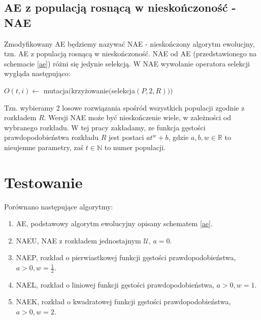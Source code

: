 \documentclass[12pt, a4paper]{article}
\begin{document}
\subsection{AE z populacją rosnącą w nieskończoność - NAE}

Zmodyfikowany AE będziemy nazywać NAE - nieskończony algorytm ewolucjny, tzn. AE z populacją rosnącą w nieskończoność.
NAE od AE (przedstawionego na schemacie \ref{ae}) różni się jedynie selekcją. W NAE wywołanie operatora selekcji wygląda następująco:

\begin{algorithm}[!htb]
\begin{algorithmic}[1] 
\State $O(t,i) \gets$ mutacja$($krzy{\.z}owanie$($selekcja$(P, 2, R)))$  
\end{algorithmic}
\end{algorithm}

Tzn. wybieramy 2 losowe rozwiązania spośród wszystkich populacji zgodnie z rozkładem $R$.
Wersji NAE może być nieskończenie wiele, w zależności od wybranego rozkładu. 
W tej pracy zakładamy, ze funkcja gęstości prawdopodobieństwa rozkładu $R$ jest postaci $at^w + b$, gdzie
$a, b, w \in \mathbb{R}$ to nieujemne parametry, zaś $t \in \mathbb{N}$ to numer populacji. 

\section{Testowanie}

Porównano następujące algorytmy:

\begin{enumerate}
 \item AE, podstawowy algorytm ewolucyjny opisany schematem \ref{ae}.
 \item NAEU, NAE z rozkładem jednostajnym $\mathcal{U}$, $a=0$.
 \item NAEP, rozkład o pierwiastkowej funkcji gęstości prawdopodobieństwa, \\$a>0, w=\frac{1}{2}$.
 \item NAEL, rozkład o liniowej funkcji gęstości prawdopodobieństwa, $a>0, w=1$.
 \item NAEK, rozkład o kwadratowej funkcji gęstości prawdopodobieństwa, \\$a>0, w=2$.
\end{enumerate}
\end{document}
